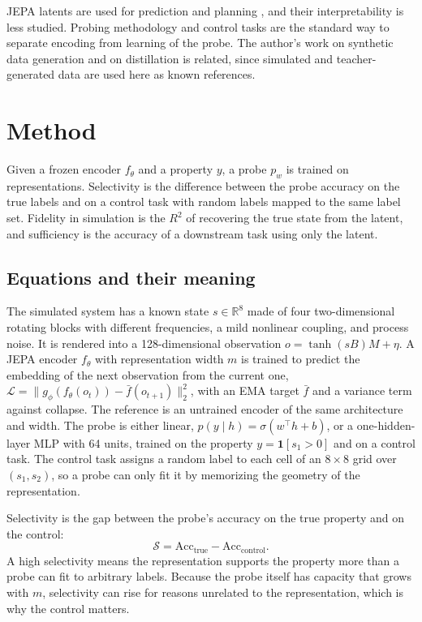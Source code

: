 \documentclass[conference]{IEEEtran}
\begin{document}
JEPA latents are used for prediction and planning \cite{bardes2024vjepa}, and their interpretability is less studied. Probing methodology and control tasks are the standard way to separate encoding from learning of the probe. The author's work on synthetic data generation \cite{d5synthetic} and on distillation \cite{d8distillation} is related, since simulated and teacher-generated data are used here as known references.

\section{Method}
Given a frozen encoder $f_\theta$ and a property $y$, a probe $p_w$ is trained on representations. Selectivity is the difference between the probe accuracy on the true labels and on a control task with random labels mapped to the same label set. Fidelity in simulation is the $R^2$ of recovering the true state from the latent, and sufficiency is the accuracy of a downstream task using only the latent.

\subsection*{Equations and their meaning}
The simulated system has a known state $s\in\mathbb{R}^{8}$ made of four two-dimensional rotating blocks with different frequencies, a mild nonlinear coupling, and process noise. It is rendered into a 128-dimensional observation $o=\tanh(sB)M+\eta$. A JEPA encoder $f_\theta$ with representation width $m$ is trained to predict the embedding of the next observation from the current one, $\mathcal{L}=\lVert g_\phi(f_\theta(o_t))-\bar f(o_{t+1})\rVert_2^2$, with an EMA target $\bar f$ and a variance term against collapse. The reference is an untrained encoder of the same architecture and width. The probe is either linear, $p(y\mid h)=\sigma(w^\top h+b)$, or a one-hidden-layer MLP with 64 units, trained on the property $y=\mathbf{1}[s_1>0]$ and on a control task. The control task assigns a random label to each cell of an $8\times 8$ grid over $(s_1,s_2)$, so a probe can only fit it by memorizing the geometry of the representation.

Selectivity is the gap between the probe's accuracy on the true property and on the control:
\begin{equation}
\mathcal{S}=\mathrm{Acc}_{\mathrm{true}}-\mathrm{Acc}_{\mathrm{control}}.
\end{equation}
A high selectivity means the representation supports the property more than a probe can fit to arbitrary labels. Because the probe itself has capacity that grows with $m$, selectivity can rise for reasons unrelated to the representation, which is why the control matters.
\end{document}
